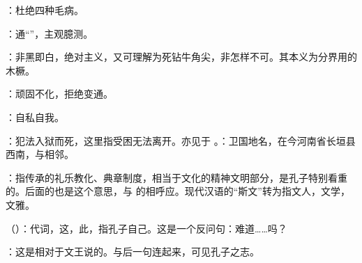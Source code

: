 {}


{
\item {}：杜绝四种毛病。
\item {}：通“”，主观臆测。
\item {}：非黑即白，绝对主义，又可理解为死钻牛角尖，非怎样不可。其本义为分界用的木橛。%
\item {}：顽固不化，拒绝变通。
\item {}：自私自我。
}
{}


{
\item {}：犯法入狱而死，这里指受困无法离开。亦见于 。：卫国地名，在今河南省长垣县西南，与相邻。%
\item {}：指传承的礼乐教化、典章制度，相当于文化的精神文明部分，是孔子特别看重的。后面的也是这个意思，与  的相呼应。现代汉语的“斯文”转为指文人，文学，文雅。
\item {}（）：代词，这，此，指孔子自己。这是一个反问句：难道……吗？
\item {}：这是相对于文王说的。与后一句连起来，可见孔子之志。
}
{}


